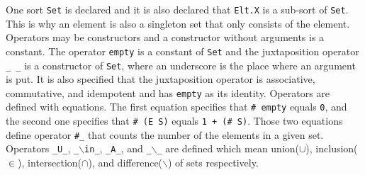 \documentclass[12pt]{report}
\newcommand{\stt}[1]{{\small{\tt {#1}}}}
\begin{document}
One sort {\tt Set} is declared and it is also declared that
{\tt Elt.X} is a sub-sort of {\tt Set}. This is why an element is also
a singleton set that only consists of the element. Operators may be
constructors and a constructor without arguments is a constant. The
operator {\tt empty} is a constant of {\tt Set} and the juxtaposition
operator {\tt \_ \_} is a constructor of {\tt Set}, where an
underscore is the place where an argument is put. It is also specified
that the juxtaposition operator is associative, commutative, and
idempotent and has {\tt empty} as its identity. Operators are defined
with equations. The first equation specifies that \stt{\# empty} equals
{\tt 0}, and the second one specifies that \stt{\# (E S)} equals \stt{1
  + (\# S)}. Those two equations define operator {\tt \#\_} that
counts the number of the elements in a given set. Operators
{\tt \_U\_}, {\tt \_$\backslash$in\_}, {\tt \_A\_}, and {\tt \_$\backslash$\_} are
defined which mean union($\cup$), inclusion($\in$),
intersection($\cap$), and difference($\backslash$) of sets respectively.
\end{document}
